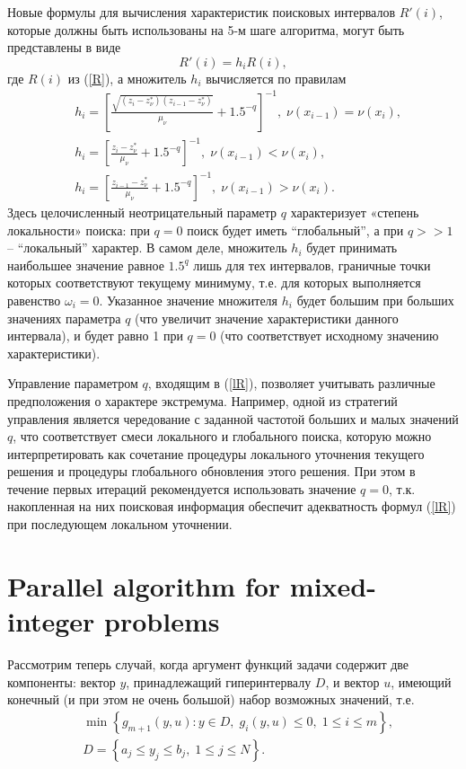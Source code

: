\documentclass[
11pt,%
tightenlines,%
twoside,%
onecolumn,%
nofloats,%
nobibnotes,%
nofootinbib,%
superscriptaddress,%
noshowpacs,%
centertags]%
{revtex4}
\begin{document}
Новые формулы для вычисления характеристик поисковых интервалов $R'(i)$, которые должны быть использованы на 5-м шаге алгоритма, могут быть представлены в виде 
\[
R'(i) = h_i R(i),
\]
где $R(i)$ из (\ref{R}), а множитель $h_i$ вычисляется по правилам
\begin{eqnarray}\label{lR}
& h_i = \left[\frac{\sqrt{(z_i-z_\nu^*)(z_{i-1}-z_\nu^*)}}{\mu_\nu}+1.5^{-q}\right]^{-1}, \; \nu(x_{i-1})=\nu(x_{i}),\nonumber\\
& h_i = \left[\frac{z_i-z_\nu^*}{\mu_\nu}+1.5^{-q}\right]^{-1}, \; \nu(x_{i-1})<\nu(x_{i}),\\
& h_i = \left[\frac{z_{i-1}-z_\nu^*}{\mu_\nu}+1.5^{-q}\right]^{-1}, \; \nu(x_{i-1})>\nu(x_{i}).\nonumber
\end{eqnarray}
Здесь целочисленный неотрицательный параметр $q$ характеризует «степень локальности» поиска: при $q=0$ поиск будет иметь ``глобальный'', а при $q>>1$ -- ``локальный'' характер. 
В самом деле, множитель $h_i$ будет принимать наибольшее значение равное $1.5^q$ лишь для тех интервалов, граничные точки которых соответствуют текущему минимуму, т.е. для которых выполняется равенство $\omega_i = 0$. Указанное значение множителя $h_i$ будет большим при больших значениях параметра $q$ (что увеличит значение характеристики данного интервала), и будет равно 1 при $q=0$ (что соответствует исходному значению характеристики). 

Управление параметром $q$, входящим в (\ref{lR}), позволяет учитывать различные предположения о характере экстремума. Например, одной из стратегий управления является чередование с заданной частотой больших и малых значений $q$, что соответствует смеси локального и глобального поиска, которую можно интерпретировать как сочетание процедуры локального уточнения текущего решения и процедуры глобального обновления этого решения. При этом в течение первых итераций рекомендуется использовать значение $q=0$, т.к. накопленная на них поисковая информация обеспечит адекватность формул (\ref{lR}) при последующем локальном уточнении.


\section{Parallel algorithm for mixed-integer problems}

Рассмотрим теперь случай, когда аргумент функций задачи содержит две компоненты: вектор $y$, принадлежащий гиперинтервалу $D$, и вектор $u$, имеющий конечный (и при этом не очень большой) набор возможных значений, т.е. 
\begin{eqnarray}\label{problem_i}
& \min{\left\{ g_{m+1}(y,u):y\in D, \; g_i(y,u)\leq 0, \; 1 \leq i \leq m\right\}},\\
& D=\left\{a_j\leq y_j \leq b_j, \; 1\leq j \leq N \right\}.\nonumber
\end{eqnarray}
\end{document}
